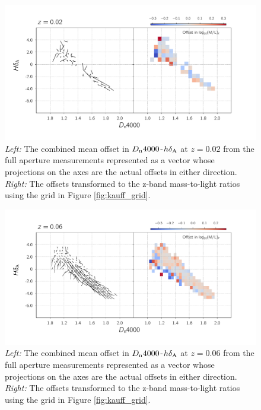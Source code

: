 \begin{figure}
\includegraphics[width=\textwidth]{figures/mlz_offset_a.pdf}
\caption[  \emph{Left:} The combined mean offset in $D_{\rm n}4000$-$h\delta_{\rm A}$ at $z=0.02$ from the full aperture measurements represented as a vector whose projections on the axes are the actual offsets in either direction. \emph{Right:} The offsets transformed to the z-band mass-to-light ratios using the grid in Figure \ref{fig:kauff_grid}. ]{ \emph{Left:} The combined mean offset in $D_{\rm n}4000$-$h\delta_{\rm A}$ at $z=0.02$ from the full aperture measurements represented as a vector whose projections on the axes are the actual offsets in either direction. \emph{Right:} The offsets transformed to the z-band mass-to-light ratios using the grid in Figure \ref{fig:kauff_grid}.
\label{fig:offset_quiver1}}
\end{figure}


\begin{figure}
\includegraphics[width=\textwidth]{figures/mlz_offset_b.pdf}
\caption[  \emph{Left:} The combined mean offset in $D_{\rm n}4000$-$h\delta_{\rm A}$ at $z=0.02$ from the full aperture measurements represented as a vector whose projections on the axes are the actual offsets in either direction. \emph{Right:} The offsets transformed to the z-band mass-to-light ratios using the grid in Figure \ref{fig:kauff_grid}. ]{ \emph{Left:} The combined mean offset in $D_{\rm n}4000$-$h\delta_{\rm A}$ at $z=0.06$ from the full aperture measurements represented as a vector whose projections on the axes are the actual offsets in either direction. \emph{Right:} The offsets transformed to the z-band mass-to-light ratios using the grid in Figure \ref{fig:kauff_grid}.
\label{fig:offset_quiver2}}
\end{figure}

